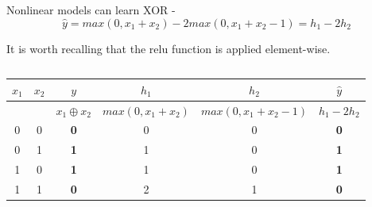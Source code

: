 \begin{frame}[t,allowframebreaks]{Nonlinear models can learn XOR -}
    \begin{equation}
        \hat{y} = 
        max(0,x_1+x_2) - 2 max(0,x_1+x_2-1) =
        h_1 - 2 h_2
        \label{eq:learn_xor_nonlinear_model_final_w_weights}
    \end{equation}        

    It is worth recalling that the \gls{relu} function is applied element-wise.\\
    \vspace{0.2cm}

    \begin{columns}[t]
        \begin{column}{0.70\textwidth}
            \vspace{-1.1cm}
            \begin{center}
                \begin{tabular}{ c c | c || c  c | c }
                 $x_1$ & 
                 $x_2$ & 
                 {\bf \color{cadmiumred}$y$} & 
                 $h_1$     & 
                 $h_2$ & 
                 {\bf \color{cadmiumgreen}$\hat{y}$} \\ 
                 \hline
                  & 
                  & 
                 {\bf \color{cadmiumred}$x_1 \oplus x_2$} & 
                 $max(0,x_1+x_2)$     & 
                 $max(0,x_1+x_2-1)$ & 
                 {\bf \color{cadmiumgreen}$h_1-2h_2$} \\ 
                 \hline
                 0 & 0 & {\bf \color{cadmiumred}0} & 0 & 0 & {\bf \color{cadmiumgreen}0} \\  
                 0 & 1 & {\bf \color{cadmiumred}1} & 1 & 0 & {\bf \color{cadmiumgreen}1} \\   
                 1 & 0 & {\bf \color{cadmiumred}1} & 1 & 0 & {\bf \color{cadmiumgreen}1} \\  
                 1 & 1 & {\bf \color{cadmiumred}0} & 2 & 1 & {\bf \color{cadmiumgreen}0} \\   
                \end{tabular}
            \end{center}
        \end{column}
        \begin{column}{0.30\textwidth}
        \end{column}
    \end{columns}

\end{frame}


